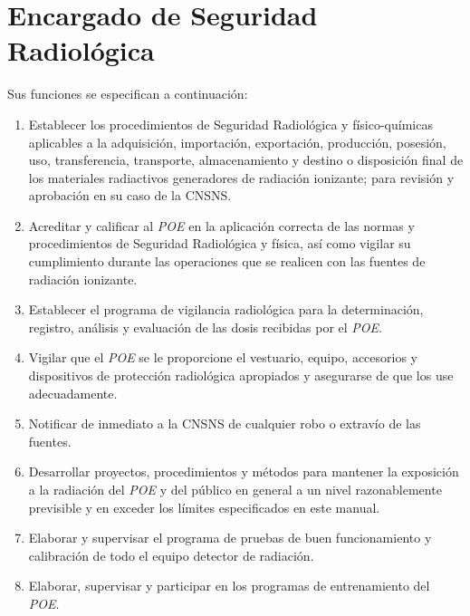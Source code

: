 \section*{Encargado de Seguridad Radiológica}

Sus funciones se especifican a continuación:
\begin{enumerate}
    \item Establecer los procedimientos de Seguridad Radiológica y físico-químicas aplicables a la adquisición, importación, exportación, producción, posesión, uso, transferencia, transporte, almacenamiento y destino o disposición final de los materiales radiactivos generadores de radiación ionizante; para revisión y aprobación en su caso de la CNSNS.
    
    \item Acreditar y calificar al \textit{POE} en la aplicación correcta de las normas y procedimientos de Seguridad Radiológica y física, así como vigilar su cumplimiento durante las operaciones que se realicen con las fuentes de radiación ionizante.
    
    \item Establecer el programa de vigilancia radiológica para la determinación, registro, análisis y evaluación de las dosis recibidas por el \textit{POE}.
    
    \item Vigilar que el \textit{POE} se le proporcione el vestuario, equipo, accesorios y dispositivos de protección radiológica apropiados y asegurarse de que los use adecuadamente.
    
    \item Notificar de inmediato a la CNSNS de cualquier robo o extravío de las fuentes.
    
    \item Desarrollar proyectos, procedimientos y métodos para mantener la exposición a la radiación del \textit{POE} y del público en general a un nivel razonablemente previsible y en exceder los límites especificados en este manual.
    
    \item Elaborar y supervisar el programa de pruebas de buen funcionamiento y calibración de todo el equipo detector de radiación.
    
    \item Elaborar, supervisar y participar en los programas de entrenamiento del \textit{POE}.
    

\end{enumerate}
